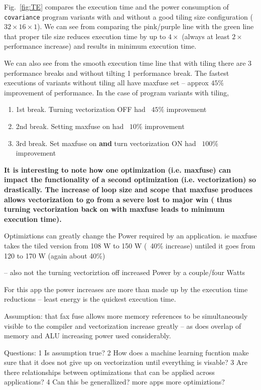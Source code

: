 Fig.~\ref{fig:TE} compares the execution time and the power consumption of 
\texttt{covariance} program variants with and without a good tiling size
configuration ($32\times16\times1$).
We can see from comparing the pink/purple line with the green line that 
proper tile size reduces execution time by up to $4\times$ (always 
at least $2\times$ performance increase) and results in
minimum execution time.  

We can also see from the smooth execution time line that 
with tiling there are 3 performance breaks and without tilting 1 performance break.
The fastest executions of variants without tiling all have maxfuse set -- approx $45\%$ improvement
of performance.
In the case of program variants with tiling, 
\begin{enumerate}
\item 1st break. Turning vectorization OFF had ~$45\%$ improvement 
\item 2nd break. Setting maxfuse on had ~$10\%$  improvement
\item 3rd break. Set maxfuse on \textbf{and} turn vectorization ON had ~$100\%$ improvement
\end{enumerate}
\textbf{It is interesting to note how one optimization (i.e. maxfuse) can impact the functionality
   of a second optimization (i.e. vectorization) so drastically. The increase of
loop size and scope that maxfuse produces allows vectorization to go from a severe lost to major win (
thus turning vectorization back on with maxfuse leads to minimum execution time). }

Optimiztions can greatly change the Power required by an application. 
ie maxfuse
   takes the tiled version from 108 W to 150 W (~40\% increase) untiled it goes
   from 120 to 170 W (again about 40\%)

   -- also not the turning vectoriztion off increased Power by a
   couple/four Watts

   For this app the power increases are more than made up by the execution
   time reductions -- least energy is the quickest execution time.

Assumption: that fax fuse allows more memory references to be simultaneously
visible to the compiler and vectorization increase greatly -- as does overlap
of memory and ALU increasing power used considerably.

Questions:  1 Is assumption true?
        2 How does a machine learning fucntion make sure that it does
           not give up on vectorization until everything is visable?
        3 Are there relationships between optimizations that can be
           applied across applications?
        4 Can this be generallized? more apps more optimiztions?

